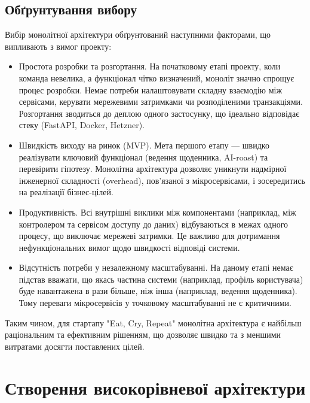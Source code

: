 \documentclass[12pt, a4paper]{article}
\begin{document}
\subsection{Обґрунтування вибору}

Вибір монолітної архітектури обґрунтований наступними факторами, що випливають
з вимог проекту:

\begin{itemize}
    \item Простота розробки та розгортання. На початковому етапі проекту, коли
        команда невелика, а функціонал чітко визначений, моноліт значно спрощує
        процес розробки. Немає потреби налаштовувати складну взаємодію між
        сервісами, керувати мережевими затримками чи розподіленими
        транзакціями. Розгортання зводиться до деплою одного застосунку, що
        ідеально відповідає стеку (FastAPI, Docker, Hetzner).

    \item Швидкість виходу на ринок (MVP). Мета першого етапу — швидко
        реалізувати ключовий функціонал (ведення щоденника, AI-roast) та
        перевірити гіпотезу. Монолітна архітектура дозволяє уникнути надмірної
        інженерної складності (overhead), пов'язаної з мікросервісами, і
        зосередитись на реалізації бізнес-цілей.

    \item Продуктивність. Всі внутрішні виклики між компонентами (наприклад,
        між контролером та сервісом доступу до даних) відбуваються в межах
        одного процесу, що виключає мережеві затримки. Це важливо для
        дотримання нефункціональних вимог щодо швидкості відповіді системи.

    \item Відсутність потреби у незалежному масштабуванні. На даному етапі
        немає підстав вважати, що якась частина системи (наприклад, профіль
        користувача) буде навантажена в рази більше, ніж інша (наприклад,
        ведення щоденника). Тому переваги мікросервісів у точковому
        масштабуванні не є критичними.
\end{itemize}

Таким чином, для стартапу "Eat, Cry, Repeat" монолітна архітектура є найбільш
раціональним та ефективним рішенням, що дозволяє швидко та з меншими витратами
досягти поставлених цілей.

\section{Створення високорівневої архітектури}
\end{document}

